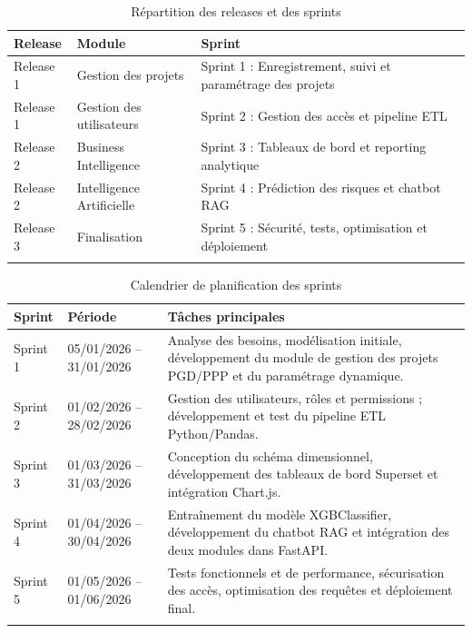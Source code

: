 \begin{longtable}{|m{3cm}|m{4cm}|m{7cm}|}
\hline
\textbf{Release} & \textbf{Module} & \textbf{Sprint} \\
\hline
\endhead

Release 1 & Gestion des projets &
Sprint 1 : Enregistrement, suivi et paramétrage des projets \\
\hline

Release 1 & Gestion des utilisateurs &
Sprint 2 : Gestion des accès et pipeline ETL \\
\hline

Release 2 & Business Intelligence &
Sprint 3 : Tableaux de bord et reporting analytique \\
\hline

Release 2 & Intelligence Artificielle &
Sprint 4 : Prédiction des risques et chatbot RAG \\
\hline

Release 3 & Finalisation &
Sprint 5 : Sécurité, tests, optimisation et déploiement \\
\hline

\captionsetup{justification=centering,margin=2cm}
\caption{Répartition des releases et des sprints}
\label{tab:release_sprints}
\end{longtable}

\vspace{0.4cm}

\begin{longtable}{|m{1.8cm}|m{4.2cm}|m{8cm}|}
\hline
\textbf{Sprint} & \textbf{Période} & \textbf{Tâches principales} \\
\hline
\endhead

Sprint 1 & 05/01/2026 -- 31/01/2026 &
Analyse des besoins, modélisation initiale, développement du
module de gestion des projets PGD/PPP et du paramétrage
dynamique. \\
\hline

Sprint 2 & 01/02/2026 -- 28/02/2026 &
Gestion des utilisateurs, rôles et permissions ; développement
et test du pipeline ETL Python/Pandas. \\
\hline

Sprint 3 & 01/03/2026 -- 31/03/2026 &
Conception du schéma dimensionnel, développement des tableaux
de bord Superset et intégration Chart.js. \\
\hline

Sprint 4 & 01/04/2026 -- 30/04/2026 &
Entraînement du modèle XGBClassifier, développement du chatbot
RAG et intégration des deux modules dans FastAPI. \\
\hline

Sprint 5 & 01/05/2026 -- 01/06/2026 &
Tests fonctionnels et de performance, sécurisation des accès,
optimisation des requêtes et déploiement final. \\
\hline

\captionsetup{justification=centering,margin=2cm}
\caption{Calendrier de planification des sprints}
\label{tab:planning_sprints}
\end{longtable}

